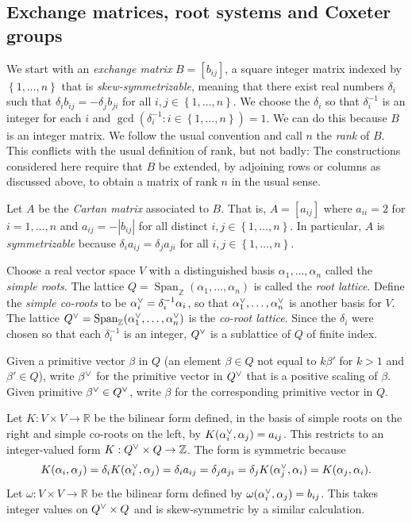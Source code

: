 \documentclass[ALCO,ThmDefs,Unicode,epreuves]{cedram}
\DeclareMathOperator{\Span}{Span}
\newcommand{\newword}[1]{\emph{#1}}
\newcommand{\integers}{\mathbb Z}
\newcommand{\reals}{\mathbb R}
\newcommand{\set}[1]{{\left\lbrace #1 \right\rbrace}}
\newcommand{\ck}{\spcheck}
\begin{document}
\subsection{Exchange matrices, root systems and Coxeter groups}\label{back sec}
We start with an \newword{exchange matrix} $B=[b_{ij}]$, a square integer matrix indexed by $\set{1,\ldots,n}$ that is \newword{skew-symmetrizable}, meaning that there exist real numbers $\delta_i$ such that $\delta_ib_{ij}=-\delta_jb_{ji}$ for all $i,j\in\set{1,\ldots,n}$.
We choose the $\delta_i$ so that $\delta_i^{-1}$ is an integer for each $i$ and $\gcd(\delta_i^{-1}:i\in\set{1,\ldots,n})=1$.
We can do this because $B$ is an integer matrix.
We follow the usual convention and call $n$ the \newword{rank} of $B$.
This conflicts with the usual definition of rank, but not badly:
The constructions considered here require that $B$ be extended, by adjoining rows or columns as discussed above, to obtain a matrix of rank $n$ in the usual sense.

Let $A$ be the \newword{Cartan matrix} associated to $B$.
That is, $A=[a_{ij}]$ where $a_{ii}=2$ for $i=1,\ldots,n$ and $a_{ij}=-|b_{ij}|$ for all distinct $i,j\in\set{1,\ldots,n}$.
In particular, $A$ is \newword{symmetrizable} because $\delta_ia_{ij}=\delta_ja_{ji}$ for all $i,j\in\set{1,\ldots,n}$.

Choose a real vector space $V$ with a distinguished basis $\alpha_1,\ldots,\alpha_n$ called the \newword{simple roots}.
The lattice $Q=\Span_\integers(\alpha_1,\ldots,\alpha_n)$ is called the \newword{root lattice}.
Define the \newword{simple co-roots} to be $\alpha_i\ck=\delta_i^{-1}\alpha_i$, so that $\alpha_1\ck,\ldots,\alpha_n\ck$ is another basis for $V$.
The lattice $Q\ck=\Span_\integers(\alpha_1\ck,\ldots,\alpha_n\ck)$ is the \newword{co-root lattice}.
Since the $\delta_i$ were chosen so that each $\delta_i^{-1}$ is an integer, $Q\ck$ is a sublattice of $Q$ of finite index.

Given a primitive vector $\beta$ in $Q$ (an element $\beta\in Q$ not equal to $k\beta'$ for $k>1$ and $\beta'\in Q$), write $\beta\ck$ for the primitive vector in $Q\ck$ that is a positive scaling of $\beta$.
Given primitive $\beta\ck\in Q\ck$, write $\beta$ for the corresponding primitive vector in $Q$.

Let $K:V\times V\to\reals$ be the bilinear form defined, in the basis of simple roots on the right and simple co-roots on the left, by $K(\alpha_i\ck,\alpha_j)=a_{ij}$.
This restricts to an integer-valued form $K:Q\ck\times Q\to\integers$.
The form is symmetric because 
\[K(\alpha_i,\alpha_j)=\delta_iK(\alpha_i\ck,\alpha_j)=\delta_ia_{ij}=\delta_ja_{ji}=\delta_jK(\alpha_j\ck,\alpha_i)=K(\alpha_j,\alpha_i).\]
Let $\omega:V\times V\to\reals$ be the bilinear form defined by $\omega(\alpha_i\ck,\alpha_j)=b_{ij}$.
This takes integer values on $Q\ck\times Q$ and is skew-symmetric by a similar calculation.
\end{document}
